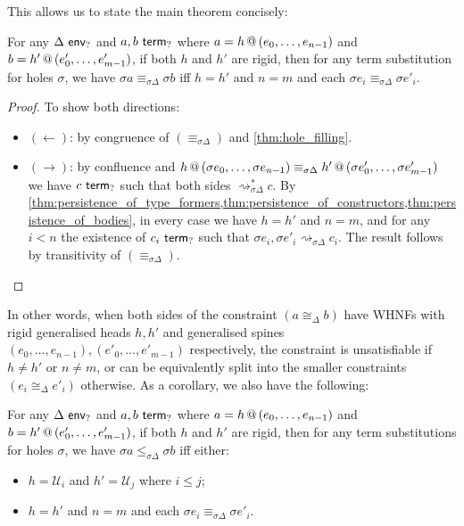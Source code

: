 \documentclass[twoside]{report}
\begin{document}
This allows us to state the main theorem concisely:

\begin{proposition}
    \label{thm:rigid_rigid_matching}
    For any $\Delta \ \mathsf{env}_{?}$ and $a, b \ \mathsf{term}_{?}$ where $a = {h}\,@\,({e_0, \ldots, e_{n-1}})$ and $b = {h'}\,@\,({e'_0, \ldots, e'_{m-1}})$, if both $h$ and $h'$ are rigid, then for any term substitution for holes $\sigma$, we have $\sigma a \equiv_{\sigma \Delta} \sigma b$ iff $h = h'$ and $n = m$ and each $\sigma {e_i} \equiv_{\sigma \Delta} \sigma {e'_i}$.
\end{proposition}

\begin{proof}
    To show both directions:
    \begin{itemize}[noitemsep]
        \item $(\leftarrow)$: by congruence of $(\equiv_{\sigma \Delta})$ and \cref{thm:hole_filling}.
        \item $(\rightarrow)$: by confluence and ${h}\,@\,({\sigma {e_0}, \ldots, \sigma {e_{n-1}}}) \equiv_{\sigma \Delta} {h'}\,@\,({\sigma {e'_0}, \ldots, \sigma {e'_{m-1}}})$ we have $c \ \mathsf{term}_{?}$ such that both sides $\rightsquigarrow_{\sigma \Delta}^\ast c$. By \cref{thm:persistence_of_type_formers,thm:persistence_of_constructors,thm:persistence_of_bodies}, in every case we have $h = h'$ and $n = m$, and for any $i < n$ the existence of $c_i \ \mathsf{term}_{?}$ such that $\sigma {e_i}, \sigma {e'_i} \rightsquigarrow_{\sigma \Delta} c_i$. The result follows by transitivity of $(\equiv_{\sigma \Delta})$. \qedhere
    \end{itemize}
\end{proof}

In other words, when both sides of the constraint $(a \cong_\Delta b)$ have WHNFs with rigid generalised heads $h, h'$ and generalised spines $(e_0, \ldots, e_{n-1}), (e'_0, \ldots, e'_{m-1})$ respectively, the constraint is unsatisfiable if $h \neq h'$ or $n \neq m$, or can be equivalently split into the smaller constraints $(e_i \cong_\Delta e'_i)$ otherwise. As a corollary, we also have the following:

\begin{proposition}
    \label{thm:rigid_rigid_subtype_matching}
    For any $\Delta \ \mathsf{env}_{?}$ and $a, b \ \mathsf{term}_{?}$ where $a = {h}\,@\,({e_0, \ldots, e_{n-1}})$ and $b = {h'}\,@\,({e'_0, \ldots, e'_{m-1}})$, if both $h$ and $h'$ are rigid, then for any term substitutions for holes $\sigma$, we have $\sigma a \leq_{\sigma \Delta} \sigma b$ iff either:
    \begin{itemize}[noitemsep]
        \item $h = \mathcal U_i$ and $h' = \mathcal U_j$ where $i \leq j$;
        \item $h = h'$ and $n = m$ and each $\sigma {e_i} \equiv_{\sigma \Delta} \sigma {e'_i}$.
    \end{itemize}
\end{proposition}
\end{document}
